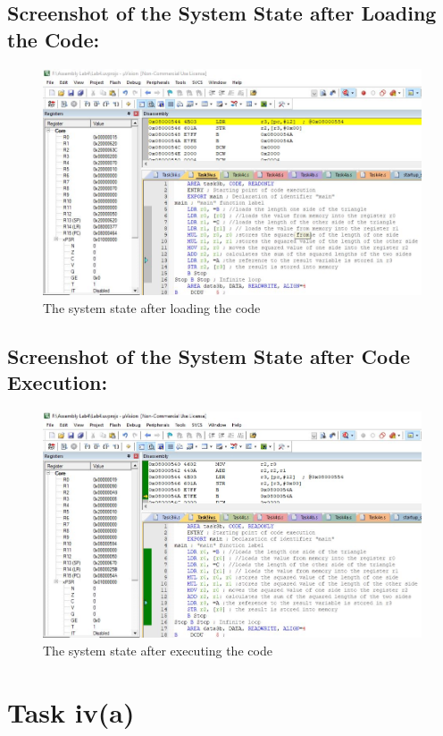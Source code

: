 \documentclass[12pt]{article}
\begin{document}
\subsection{Screenshot of the System State after Loading the Code:}
\begin{figure}[ht]
     \centering
     \includegraphics[scale=.7]{images/beforetask3b.JPG}
     \caption{The system state after loading the code}
     \label{fig:before_task_three_b}
 \end{figure}
 \pagebreak
 \subsection{Screenshot of the System State after Code Execution:}
 \begin{figure}[ht]
     \centering
     \includegraphics[scale=.7]{images/aftertask3b.JPG}
     \caption{The system state after executing the code}
     \label{fig:after_task_three_b}
 \end{figure}
 \pagebreak\section{Task iv(a)}
\end{document}
